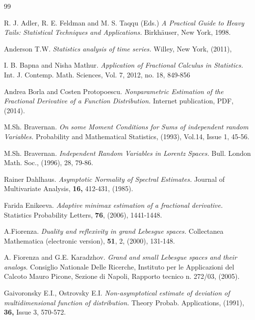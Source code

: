 \begin{thebibliography}{99}

\vspace{3mm}

{\sc R. J. Adler, R. E. Feldman and M. S. Taqqu (Eds.)} {\it A Practical Guide to Heavy Tails:
Statistical Techniques and Applications. } Birkh\"auser, New York, 1998.

{\sc Anderson T.W.} {\it Statistics analysis of time series.} Willey, New York, (2011),

{\sc I. B. Bapna and Nisha Mathur.} {\it Application of Fractional Calculus in Statistics.}
Int. J. Contemp. Math. Sciences, Vol. 7, 2012, no. 18, 849-856

{\sc Andrea Borla and Costen Protopoescu.} {\it  Nonparametric Estimation of the Fractional
Derivative of a Function Distribution. }
Internet publication, PDF, (2014).

{\sc M.Sh. Bravernan.} {\it On some Moment Conditions for Sums of independent
random Variables. } Probability and Mathematical Statistics, (1993), Vol.14, Issue 1, 45-56.

{\sc M.Sh. Bravernan.} {\it Independent Random Variables in Lorentz Spaces.} Bull.
London Math. Soc., (1996), 28, 79-86.

{\sc Rainer Dahlhaus.} {\it Asymptotic Normality of Spectral Estimates.}
Journal of Multivariate Analysis, {\bf 16,}  412-431, (1985).

{\sc Farida Enikeeva. } {\it Adaptive minimax estimation of a fractional derivative.}
Statistics Probability Letters, {\bf 76},  (2006),  1441-1448.

{\sc A.Fiorenza.} {\it Duality and reflexivity in grand Lebesgue spaces.}
Collectanea Mathematica (electronic version), {\bf 51}, 2, (2000), 131-148.

{\sc A. Fiorenza and G.E. Karadzhov.} {\it Grand and small Lebesgue spaces and
their analogs.} Consiglio Nationale Delle Ricerche, Instituto per le
Applicazioni del Calcoto Mauro Picone, Sezione di Napoli, Rapporto tecnico n. 272/03, (2005).

{\sc Gaivoronsky E.I., Ostrovsky E.I.} {\it Non-asymptotical estimate of deviation of multidimensional function of distribution.}
Theory Probab. Applications, (1991), {\bf 36,} Issue 3, 570-572. \par


\end{thebibliography}
